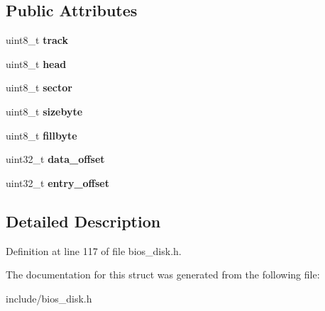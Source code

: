 \subsection*{Public Attributes}
\begin{DoxyCompactItemize}
\item 
\hypertarget{structimageDiskVFD_1_1vfdentry_a584716a3b21efbb6fb92e6d4a9fd30bf}{uint8\-\_\-t {\bfseries track}}\label{structimageDiskVFD_1_1vfdentry_a584716a3b21efbb6fb92e6d4a9fd30bf}

\item 
\hypertarget{structimageDiskVFD_1_1vfdentry_a4a98505e2f0be19cf7a7a6df5e5ea4a8}{uint8\-\_\-t {\bfseries head}}\label{structimageDiskVFD_1_1vfdentry_a4a98505e2f0be19cf7a7a6df5e5ea4a8}

\item 
\hypertarget{structimageDiskVFD_1_1vfdentry_ab2db645ccdbcbc76267db774f486b972}{uint8\-\_\-t {\bfseries sector}}\label{structimageDiskVFD_1_1vfdentry_ab2db645ccdbcbc76267db774f486b972}

\item 
\hypertarget{structimageDiskVFD_1_1vfdentry_a1f299aea35eccb67232f2f72eb3472b1}{uint8\-\_\-t {\bfseries sizebyte}}\label{structimageDiskVFD_1_1vfdentry_a1f299aea35eccb67232f2f72eb3472b1}

\item 
\hypertarget{structimageDiskVFD_1_1vfdentry_a7bb993c2cfaef8d5b06749015f821986}{uint8\-\_\-t {\bfseries fillbyte}}\label{structimageDiskVFD_1_1vfdentry_a7bb993c2cfaef8d5b06749015f821986}

\item 
\hypertarget{structimageDiskVFD_1_1vfdentry_ae3f61135f4078782c64c798ca905b9df}{uint32\-\_\-t {\bfseries data\-\_\-offset}}\label{structimageDiskVFD_1_1vfdentry_ae3f61135f4078782c64c798ca905b9df}

\item 
\hypertarget{structimageDiskVFD_1_1vfdentry_ac9240537467abe687506ac21be081991}{uint32\-\_\-t {\bfseries entry\-\_\-offset}}\label{structimageDiskVFD_1_1vfdentry_ac9240537467abe687506ac21be081991}

\end{DoxyCompactItemize}


\subsection{Detailed Description}


Definition at line 117 of file bios\-\_\-disk.\-h.



The documentation for this struct was generated from the following file\-:\begin{DoxyCompactItemize}
\item 
include/bios\-\_\-disk.\-h\end{DoxyCompactItemize}
